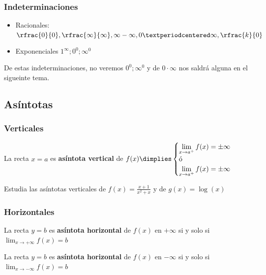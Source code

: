 \subsubsection{Indeterminaciones}

\begin{itemize}
	\item Racionales: $\rfrac{0}{0},\rfrac{\infty}{\infty},\infty-\infty,0·\infty, \rfrac{k}{0}$ 
	\item Exponenciales $1^{\infty}; 0^0; \infty^0$
\end{itemize}

De estas indeterminaciones, no veremos $0^0; \infty^0$ y de $0·\infty$ nos saldrá alguna en el sigueinte tema.

\subsection{Asíntotas}

\subsubsection{Verticales}

\begin{defn}

La recta $x=a$ es \textbf{asíntota vertical} de $f(x)\dimplies \displaystyle\begin{cases}\displaystyle\lim_{x\to a^+}f(x) = \pm\infty\\ \text{ó}\\ \displaystyle\lim_{x\to a^+}f(x) = \pm\infty\end{cases}$
\end{defn}

\begin{problem}
Estudia las asíntotas verticales de $f(x) = \frac{x+1}{x^2+x}$ y de $g(x) = \log(x)$
\solution
\end{problem}


\subsubsection{Horizontales}

\begin{defn}

La recta $y=b$ es \textbf{asíntota horizontal} de $f(x)$ en $+\infty$ si y solo si $ \displaystyle\lim_{x\to +\infty}f(x) = b$

La recta $y=b$ es \textbf{asíntota horizontal} de $f(x)$ en $-\infty$ si y solo si $ \displaystyle\lim_{x\to -\infty}f(x) = b$

\end{defn}

